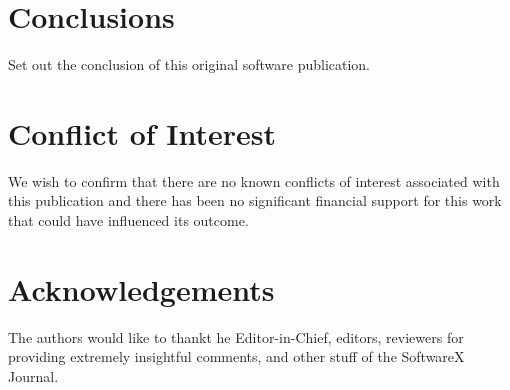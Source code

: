 \documentclass[authoryear,preprint,review,12pt]{elsarticle}
\begin{document}
\section{Conclusions}
\label{section:conclusion}
{\color{red}Set out the conclusion of this original software publication.}


\section{Conflict of Interest}
We wish to confirm that there are no known conflicts of interest associated with this publication and there has been no significant financial support for this work that could have influenced its outcome.


\section*{Acknowledgements}
\label{section:Acknowledgements}

The authors would like to thankt he Editor-in-Chief, editors, reviewers for providing extremely insightful comments, and other stuff  of the SoftwareX Journal.



 







\end{document}

